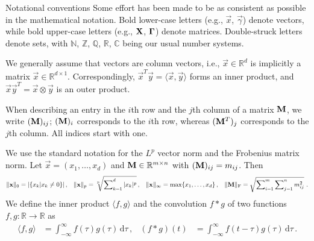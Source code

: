 \begin{FloatingBox}{Notational conventions}
\setlength{\parskip}{0.5em}
Some effort has been made to be as consistent as possible in the mathematical notation.
Bold lower-case letters (e.g., $\vec x$, $\vec \gamma$) denote vectors, while bold upper-case letters (e.g., $\mathbf{X}$, $\mathbf{\Gamma}$) denote matrices.
Double-struck letters denote sets, with $\mathbb{N}$, $\mathbb{Z}$, $\mathbb{Q}$, $\mathbb{R}$, $\mathbb{C}$ being our usual number systems.

We generally assume that vectors are column vectors, i.e., $\vec x \in \mathbb{R}^d$ is implicitly a matrix $\vec x \in \mathbb{R}^{d \times 1}$.
Correspondingly, $\vec x^T \vec y =  \langle \vec x, \vec y \rangle$ forms an inner product, and $\vec x \vec y^T = \vec x \otimes \vec y$ is an outer product.

When describing an entry in the $i$th row and the $j$th column of a matrix $\mathbf{M}$, we write $( \mathbf{M} )_{ij}$; $(\mathbf{M})_i$ corresponds to the $i$th row, whereas $(\mathbf{M}^T)_j$ corresponds to the $j$th column.
All indices start with one.

We use the standard notation for the $L^p$ vector norm and the Frobenius matrix norm. Let $\vec x = (x_1, \ldots, x_d)$ and $\mathbf{M} \in \mathbb{R}^{m \times n}$ with $(\mathbf{M})_{ij} = m_{ij}$. Then
\begin{align*}
	\|\mathbf{x}\|_0 &= | \{ x_k | x_k \neq 0 \} | \,, & 
	\|\mathbf{x}\|_p &= \sqrt[p\,\,]{\sum\nolimits_{k=1}^d |x_k|^p } \,, &
	\|\mathbf{x}\|_\infty &= \max\{ x_1, \ldots, x_d\} \,, &
	\| \mathbf{M} \|_\mathrm{F} = \sqrt{\sum\nolimits_{i=1}^m \sum\nolimits_{j=1}^n m_{ij}^2} \,\,.
\end{align*}
We define the inner product $\langle f, g \rangle$ and the convolution $f \ast g$ of two functions $f, g : \mathbb{R} \longrightarrow \mathbb{R}$ as
\begin{align*}
	\langle f, g \rangle &= \int_{-\infty}^\infty f(\tau) g(\tau) \,\mathrm{d}{\tau} \,, & 
	(f \ast g)(t) &= \int_{-\infty}^\infty f(t - \tau) g(\tau) \,\mathrm{d}{\tau} \,.
\end{align*}
\end{FloatingBox}
